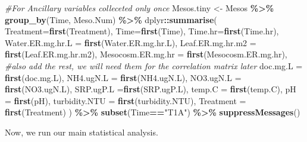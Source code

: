 \documentclass[
]{article}
\newenvironment{Shaded}{\begin{snugshade}}{\end{snugshade}}
\newcommand{\AttributeTok}[1]{\textcolor[rgb]{0.13,0.29,0.53}{#1}}
\newcommand{\CommentTok}[1]{\textcolor[rgb]{0.56,0.35,0.01}{\textit{#1}}}
\newcommand{\FunctionTok}[1]{\textcolor[rgb]{0.13,0.29,0.53}{\textbf{#1}}}
\newcommand{\NormalTok}[1]{#1}
\newcommand{\OtherTok}[1]{\textcolor[rgb]{0.56,0.35,0.01}{#1}}
\newcommand{\SpecialCharTok}[1]{\textcolor[rgb]{0.81,0.36,0.00}{\textbf{#1}}}
\newcommand{\StringTok}[1]{\textcolor[rgb]{0.31,0.60,0.02}{#1}}
\begin{document}
\begin{Shaded}
\begin{Highlighting}[]
\CommentTok{\#For Ancillary variables colleceted only once}
\NormalTok{Mesos.tiny }\OtherTok{\textless{}{-}}\NormalTok{ Mesos }\SpecialCharTok{\%\textgreater{}\%} 
  \FunctionTok{group\_by}\NormalTok{(Time, Meso.Num) }\SpecialCharTok{\%\textgreater{}\%} 
\NormalTok{  dplyr}\SpecialCharTok{::}\FunctionTok{summarise}\NormalTok{(}
    \AttributeTok{Treatment=}\FunctionTok{first}\NormalTok{(Treatment),}
    \AttributeTok{Time=}\FunctionTok{first}\NormalTok{(Time),}
    \AttributeTok{Time.hr=}\FunctionTok{first}\NormalTok{(Time.hr),}
    \AttributeTok{Water.ER.mg.hr.L =} \FunctionTok{first}\NormalTok{(Water.ER.mg.hr.L),}
    \AttributeTok{Leaf.ER.mg.hr.m2 =} \FunctionTok{first}\NormalTok{(Leaf.ER.mg.hr.m2),}
    \AttributeTok{Mesocosm.ER.mg.hr =} \FunctionTok{first}\NormalTok{(Mesocosm.ER.mg.hr),}
    \CommentTok{\#also add the rest, we will need them for the correlation matrix later}
    \AttributeTok{doc.mg.L =} \FunctionTok{first}\NormalTok{(doc.mg.L),}
    \AttributeTok{NH4.ugN.L =} \FunctionTok{first}\NormalTok{(NH4.ugN.L),}
    \AttributeTok{NO3.ugN.L =} \FunctionTok{first}\NormalTok{(NO3.ugN.L),}
    \AttributeTok{SRP.ugP.L =}\FunctionTok{first}\NormalTok{(SRP.ugP.L),}
    \AttributeTok{temp.C =} \FunctionTok{first}\NormalTok{(temp.C),}
    \AttributeTok{pH =} \FunctionTok{first}\NormalTok{(pH),}
    \AttributeTok{turbidity.NTU =} \FunctionTok{first}\NormalTok{(turbidity.NTU),}
    \AttributeTok{Treatment =} \FunctionTok{first}\NormalTok{(Treatment)}
\NormalTok{  ) }\SpecialCharTok{\%\textgreater{}\%} 
  \FunctionTok{subset}\NormalTok{(Time}\SpecialCharTok{==}\StringTok{"T1A"}\NormalTok{) }\SpecialCharTok{\%\textgreater{}\%} 
  \FunctionTok{suppressMessages}\NormalTok{()}
\end{Highlighting}
\end{Shaded}

Now, we run our main statistical analysis.
\end{document}
